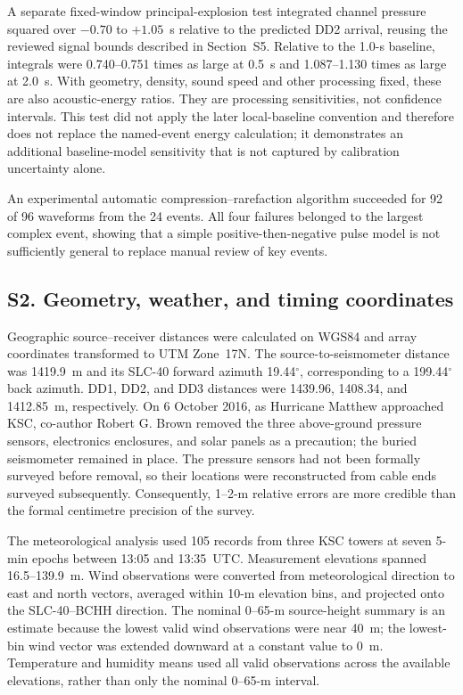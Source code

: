 \documentclass[]{seismica}
\begin{document}
A separate fixed-window principal-explosion test integrated channel pressure
squared over $-0.70$ to $+1.05$~s relative to the predicted DD2 arrival, reusing
the reviewed signal bounds described in Section~S5. Relative to the 1.0-s
baseline, integrals were 0.740--0.751 times as large at 0.5~s and
1.087--1.130 times as large at 2.0~s. With geometry, density, sound speed and
other processing fixed, these are also acoustic-energy ratios. They are
processing sensitivities, not confidence intervals. This test did not apply
the later local-baseline convention and therefore does not replace the
named-event energy calculation; it demonstrates an additional baseline-model
sensitivity that is not captured by calibration uncertainty alone.

An experimental automatic compression--rarefaction algorithm succeeded for
92 of 96 waveforms from the 24 events. All four failures belonged to the
largest complex event, showing that a simple positive-then-negative pulse model
is not sufficiently general to replace manual review of key events.

\FloatBarrier
\subsection{S2. Geometry, weather, and timing coordinates}
\label{sec:supp_weather}

Geographic source--receiver distances were calculated on WGS84 and array
coordinates transformed to UTM Zone~17N. The source-to-seismometer distance
was 1419.9~m and its SLC-40 forward azimuth 19.44$^\circ$, corresponding to a
199.44$^\circ$ back azimuth. DD1, DD2, and DD3 distances were 1439.96,
1408.34, and 1412.85~m, respectively. On 6 October 2016, as Hurricane Matthew approached
KSC, co-author Robert G. Brown removed the three above-ground pressure sensors,
electronics enclosures, and solar panels as a precaution; the buried
seismometer remained in place. The pressure sensors had not been formally
surveyed before removal, so their locations were reconstructed from cable ends
surveyed subsequently. Consequently, 1--2-m relative errors are more credible
than the formal centimetre precision of the survey.

The meteorological analysis used 105 records from three KSC towers at seven
5-min epochs between 13:05 and 13:35~UTC. Measurement elevations spanned
16.5--139.9~m. Wind observations were converted from meteorological direction
to east and north vectors, averaged within 10-m elevation bins, and projected
onto the SLC-40--BCHH direction. The nominal 0--65-m source-height summary is
an estimate because the lowest valid wind observations were near 40~m; the
lowest-bin wind vector was extended downward at a constant value to 0~m.
Temperature and humidity means used all valid observations across the
available elevations, rather than only the nominal 0--65-m interval.
\end{document}

